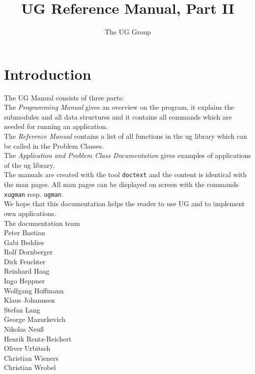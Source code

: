 



\pagestyle{myheadings}
\sloppy
\makeindex




\newcommand{\sectitle}{\mbox{}}
\setcounter{page}{0}

\title{UG Reference Manual, Part II}
\author{The UG Group}
\maketitle



\section*{Introduction}

The UG Manual consists of three parts:
\\[5mm]  
The {\em Programming Manual} gives an overview on the program, it
explains the submodules and all data structures and it contains
all commands which are needed for running an application.
\\[5mm]  
The {\em Reference Manual} contains a list of all 
functions in the ug library which can be called in the Problem Classes.
\\[5mm]
The {\em Application and Problem Class Documentation} gives examples
of applications of the ug library.
\\[5mm]
The manuals are created with the tool {\tt doctext} and the content is 
identical with the man pages. All man pages can be displayed on screen 
with the commands {\tt xugman} resp. {\tt ugman}.
\\[5mm]
We hope that this documentation helps the reader to use UG 
and to implement own applications.
\\[1cm]
The documentation team
\\[1cm]
Peter Bastian\\
Gabi Beddies\\
Rolf Dornberger\\
Dirk Feuchter\\
Reinhard Haag\\
Ingo Heppner\\
Wolfgang Hoffmann\\
Klaus Johannsen\\
Stefan Lang\\
George Mazurkevich\\
Nikolas Neu\ss\\
Henrik Rentz-Reichert\\
Oliver Urbitsch\\
Christian Wieners\\
Christian Wrobel

